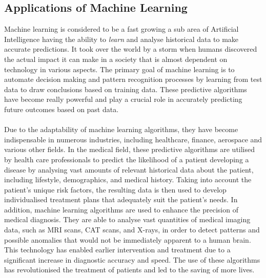 \documentclass{article}[12pt]
\theoremstyle{definition}
\begin{document}
\bigskip

\subsection{Applications of Machine Learning}

\bigskip

Machine learning is considered to be a fast growing a sub area of Artificial Intelligence having the ability to \emph{learn} and analyse historical data to make accurate predictions. It took over the world by a storm when humans discovered the actual impact it can make in a society that is almost dependent on technology in various aspects. The primary goal of machine learning is to automate decision making and pattern recognition processes by learning from test data to draw conclusions based on training data. These predictive algorithms have become really powerful and play a crucial role in accurately predicting future outcomes based on past data. 
\\
\\
Due to the adaptability of machine learning algorithms, they have become indispensable in numerous industries, including healthcare, finance, aerospace and various other fields. In the medical field, these predictive algorithms are utilised by health care professionals to predict the likelihood of a patient developing a disease by analysing vast amounts of relevant historical data about the patient, including lifestyle, demographics, and medical history. Taking into account the patient's unique risk factors, the resulting data is then used to develop individualised treatment plans that adequately suit the patient's needs. In addition, machine learning algorithms are used to enhance the precision of medical diagnosis. They are able to analyse vast quantities of medical imaging data, such as MRI scans, CAT scans, and X-rays, in order to detect patterns and possible anomalies that would not be immediately apparent to a human brain. This technology has enabled earlier intervention and treatment due to a significant increase in diagnostic accuracy and speed. The use of these algorithms has revolutionised the treatment of patients and led to the saving of more lives. 
\\
\\
\end{document}
